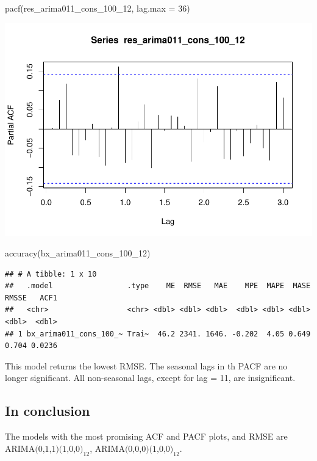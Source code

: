 \documentclass[
]{article}
\newenvironment{Shaded}{\begin{snugshade}}{\end{snugshade}}
\newcommand{\AttributeTok}[1]{\textcolor[rgb]{0.77,0.63,0.00}{#1}}
\newcommand{\DecValTok}[1]{\textcolor[rgb]{0.00,0.00,0.81}{#1}}
\newcommand{\FunctionTok}[1]{\textcolor[rgb]{0.00,0.00,0.00}{#1}}
\newcommand{\NormalTok}[1]{#1}
\begin{document}
\begin{Shaded}
\begin{Highlighting}[]
\FunctionTok{pacf}\NormalTok{(res\_arima011\_cons\_100\_12, }\AttributeTok{lag.max =} \DecValTok{36}\NormalTok{)}
\end{Highlighting}
\end{Shaded}

\includegraphics{eighth_meeting_notes_files/figure-latex/unnamed-chunk-4-2.pdf}

\begin{Shaded}
\begin{Highlighting}[]
\FunctionTok{accuracy}\NormalTok{(bx\_arima011\_cons\_100\_12)}
\end{Highlighting}
\end{Shaded}

\begin{verbatim}
## # A tibble: 1 x 10
##   .model                 .type    ME  RMSE   MAE    MPE  MAPE  MASE RMSSE   ACF1
##   <chr>                  <chr> <dbl> <dbl> <dbl>  <dbl> <dbl> <dbl> <dbl>  <dbl>
## 1 bx_arima011_cons_100_~ Trai~  46.2 2341. 1646. -0.202  4.05 0.649 0.704 0.0236
\end{verbatim}

This model returns the lowest RMSE. The seasonal lags in th PACF are no
longer significant. All non-seasonal lags, except for lag = 11, are
insignificant.

\hypertarget{in-conclusion}{%
\subsection{In conclusion}\label{in-conclusion}}

The models with the most promising ACF and PACF plots, and RMSE are
\(\text{ARIMA(0,1,1)(1,0,0)}_{12}\),
\(\text{ARIMA(0,0,0)(1,0,0)}_{12}\).
\end{document}
